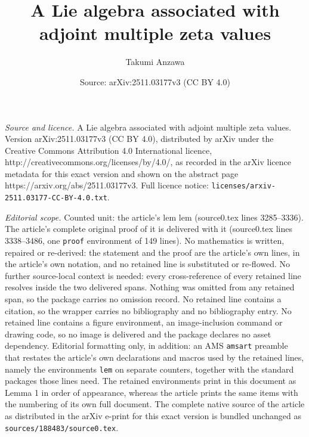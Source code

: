 \documentclass[10pt,a4paper]{amsart}
\title{A Lie algebra associated with adjoint multiple zeta values}
\author{Takumi Anzawa}
\date{Source: arXiv:2511.03177v3 (CC BY 4.0)}
\begin{document}
\maketitle

\noindent\emph{Source and licence.} A Lie algebra associated with adjoint multiple zeta values. Version arXiv:2511.03177v3 (CC BY 4.0), distributed by arXiv under the Creative Commons Attribution 4.0 International licence, http://creativecommons.org/licenses/by/4.0/, as recorded in the arXiv licence metadata for this exact version and shown on the abstract page https://arxiv.org/abs/2511.03177v3. Full licence notice: \texttt{licenses/arxiv-2511.03177-CC-BY-4.0.txt}.\par\smallskip

\noindent\textit{Editorial scope.} Counted unit: the article's lem lem (source0.tex lines 3285--3336). The article's complete original proof of it is delivered with it (source0.tex lines 3338--3486, one \texttt{proof} environment of 149 lines). No mathematics is written, repaired or re-derived: the statement and the proof are the article's own lines, in the article's own notation, and no retained line is substituted or re-flowed.  No further source-local context is needed: every cross-reference of every retained line resolves inside the two delivered spans.  Nothing was omitted from any retained span, so the package carries no omission record.  No retained line contains a citation, so the wrapper carries no bibliography and no bibliography entry.  No retained line contains a figure environment, an image-inclusion command or drawing code, so no image is delivered and the package declares no asset dependency.  Editorial formatting only, in addition: an AMS \texttt{amsart} preamble that restates the article's own declarations and macros used by the retained lines, namely the environments \texttt{lem} on separate counters, together with the standard packages those lines need.  The retained environments print in this document as Lemma 1 in order of appearance, whereas the article prints the same items with the numbering of its own full document.  The complete native source of the article as distributed in the arXiv e-print for this exact version is bundled unchanged as \texttt{sources/188483/source0.tex}.
\end{document}
